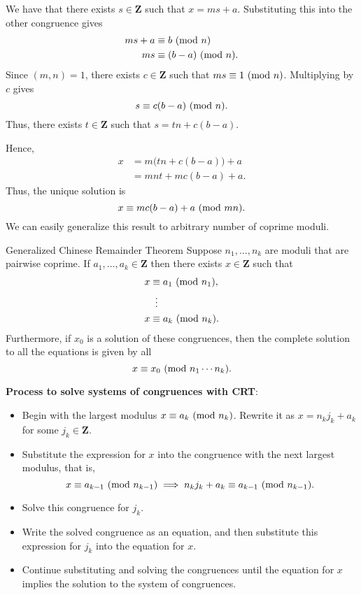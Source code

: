 We have that there exists $ s\in\mathbf{Z} $ such that $ x=ms+a $. Substituting this into the other congruence
gives
\begin{align*}
    ms+a & \equiv b\ (\mathrm{mod}\ n)      \\
    ms   & \equiv (b-a)\ (\mathrm{mod}\ n).
\end{align*}
Since $ (m,n)=1 $, there exists $ c\in\mathbf{Z} $ such that $ ms\equiv 1\ (\mathrm{mod}\ n) $. Multiplying by $ c $
gives
\[ s\equiv c(b-a)\ (\mathrm{mod}\ n). \]
Thus, there exists $ t\in\mathbf{Z} $ such that $ s=tn+c(b-a) $.

Hence,
\begin{align*}
    x & =m\bigl(tn+c(b-a)\bigr)+a \\
      & =mnt+mc(b-a)+a.
\end{align*}
Thus, the unique solution is
\[ x\equiv mc(b-a)+a\ (\mathrm{mod}\ mn). \]
We can easily generalize this result to arbitrary number of coprime moduli.
\begin{Theorem}{Generalized Chinese Remainder Theorem}{}
    Suppose $ n_1,\ldots,n_k $ are moduli that are pairwise coprime. If $ a_1,\ldots,a_k\in\mathbf{Z} $
    then there exists $ x\in\mathbf{Z} $ such that
    \begin{align*}
        x & \equiv a_1\Mod{n_1}, \\
          & \vdotswithin{\equiv} \\
        x & \equiv a_k\Mod{n_k}.
    \end{align*}
    Furthermore, if $ x_0 $ is a solution of these congruences, then the complete solution
    to all the equations is given by all
    \[ x\equiv x_0\ (\mathrm{mod}\ n_1\cdots n_k). \]
\end{Theorem}
\textbf{Process to solve systems of congruences with CRT}:
\begin{itemize}
    \item Begin with the largest modulus $ x\equiv a_k\ (\mathrm{mod}\ n_k) $.
          Rewrite it as $ x=n_k j_k+a_k $ for some $ j_k\in\mathbf{Z} $.
    \item Substitute the expression for $x$ into the congruence with the next largest
          modulus, that is,
          \[ x\equiv a_{k-1}\ (\mathrm{mod}\ n_{k-1})\implies n_k j_k+a_k\equiv a_{k-1}\ (\mathrm{mod}\ n_{k-1}). \]
    \item Solve this congruence for $j_k$.
    \item Write the solved congruence as an equation, and then substitute this expression for
          $ j_k $ into the equation for $x$.
    \item Continue substituting and solving the congruences until the equation for
          $x$ implies the solution to the system of congruences.
\end{itemize}
